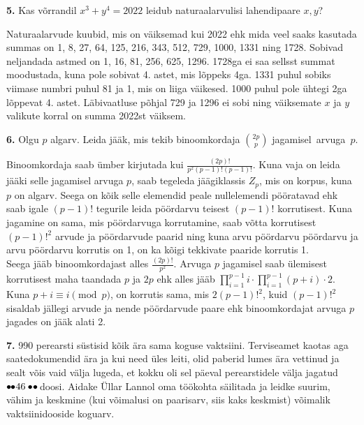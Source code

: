 \documentclass[a4paper, 10pt]{article}
\begin{document}
\bigskip

\noindent \textbf{5.} Kas võrrandil $x^3+y^4=2022$ leidub naturaalarvulisi lahendipaare $x,y$?

\bigskip
Naturaalarvude kuubid, mis on väiksemad kui 2022 ehk mida veel saaks kasutada summas on 1, 8, 27, 64, 125, 216, 343, 512, 729, 1000, 1331 ning 1728. Sobivad neljandada astmed on 1, 16, 81, 256, 625, 1296.
1728ga ei saa sellsst summat moodustada, kuna pole sobivat 4. astet, mis lõppeks 4ga. 1331 puhul sobiks viimase numbri puhul 81 ja 1, mis on liiga väikesed. 1000 puhul pole ühtegi 2ga lõppevat 4. astet. Läbivaatluse põhjal 729 ja 1296 ei sobi ning väiksemate $x$ ja $y$ valikute korral on summa 2022st väiksem.
\bigskip

\noindent \textbf{6.} Olgu $p$ algarv. Leida jääk, mis tekib binoomkordaja ${2p \choose p}$ \mbox{jagamisel arvuga $p$.}

\bigskip

Binoomkordaja saab ümber kirjutada kui $\frac{(2p)!}{p^2(p-1)!(p-1)!}$. Kuna vaja on leida jääki selle jagamisel arvuga $p$, saab tegeleda jäägiklassis $Z_p$, mis on korpus, kuna $p$ on algarv. Seega on kõik selle elemendid peale nullelemendi pööratavad ehk saab igale $(p-1)!$ tegurile leida pöördarvu teisest $(p-1)!$ korrutisest. Kuna jagamine on sama, mis pöördarvuga korrutamine, saab võtta korrutisest $(p-1)!^2$ arvude ja pöördarvude paarid ning kuna arvu pöördarvu pöördarvu ja arvu pöördarvu korrutis on 1, on ka kõigi tekkivate paaride korrutis 1.\\
Seega jääb binoomkordajast alles $\frac{(2p)!}{p^2}$. Arvuga $p$ jagamisel saab ülemisest korrutisest maha taandada $p$ ja $2p$ ehk alles jääb $\prod_{i=1}^{p-1} i\cdot\prod_{i=1}^{p-1}(p+i)\cdot 2$. Kuna $p+i\equiv i\pmod p$, on korrutis sama, mis $2(p-1)!^2$, kuid $(p-1)!^2$ sisaldab jällegi arvude ja nende pöördarvude paare ehk binoomkordajat arvuga $p$ jagades on jääk alati 2.

\bigskip
\pagebreak

\noindent \textbf{7.} 990 perearsti süstisid kõik ära sama koguse vaktsiini. Terviseamet kaotas aga saatedokumendid ära ja kui need üles leiti, olid paberid lumes ära vettinud ja sealt võis vaid välja lugeda, et kokku oli sel päeval perearstidele välja jagatud $\bullet\hskip-2pt\hskip-1pt\bullet\hskip-1pt\hskip-1pt46\bullet\hskip-1pt\hskip-1pt\bullet\hskip-2pt$ doosi. Aidake Üllar Lannol oma töökohta säilitada ja leidke suurim, vähim ja keskmine (kui võimalusi on paarisarv, siis kaks keskmist) võimalik vaktsiinidooside koguarv. 
\end{document}
